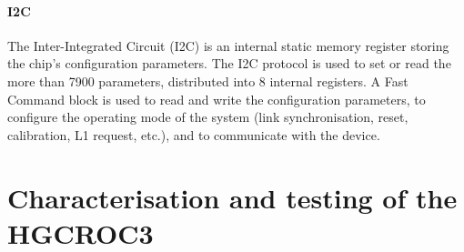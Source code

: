 \paragraph{I2C}
The Inter-Integrated Circuit (I2C) is an internal static memory register storing the chip's configuration parameters.
The I2C protocol is used to set or read the more than 7900 parameters, distributed into 8 internal registers.
A Fast Command block is used to read and write the configuration parameters, to configure the operating mode of the system (link synchronisation, reset, calibration, L1 request, etc.), and to communicate with the device.

\section{Characterisation and testing of the HGCROC3}
\label{sec:Characterisation and testing of the HGCROC3}

